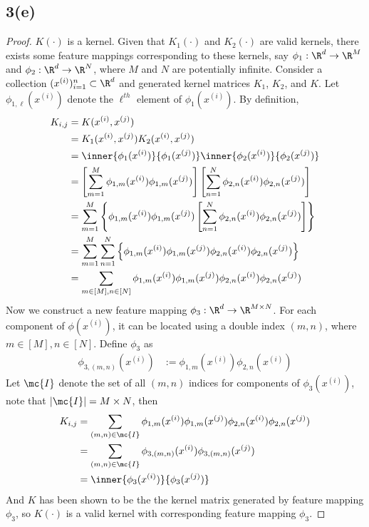 \documentclass[11pt]{article}
\newcommand{\upi}[0]{^{(i)}}
\newcommand{\upj}[0]{^{(j)}}
\begin{document}
	\subsection{3(e)}
	\begin{proof}
		$K(\cdot)$ is a kernel. Given that $K_1(\cdot)$ and $K_2(\cdot)$ are valid kernels, there exists some feature mappings corresponding to these kernels, say $\phi_1: \R^d \to \R^M$ and $\phi_2: \R^d \to \R^N$, where $M$ and $N$ are potentially infinite. Consider a collection $(x\upi)_{i=1}^n \subset \R^d$ and generated kernel matrices $K_1$, $K_2$, and $K$. Let $\phi_{1, \ell}(x\upi)$ denote the $\ell^{th}$ element of $\phi_1(x\upi)$. By definition,
		\begin{align}
			K_{i, j} &= K(x\upi, x\upj) \\
			&= K_1(x\upi, x^{(j)}) K_2(x\upi, x\upj) \\
			&= \inner{\phi_1(x\upi)}{\phi_1(x\upj)} \inner{\phi_2(x\upi)}{\phi_2(x\upj)} \\
			&= \left [
			\sum_{m=1}^M \phi_{1,m} (x\upi) \phi_{1,m}(x\upj)
			\right] \left[
			\sum_{n=1}^N \phi_{2,n} (x\upi) \phi_{2,n}(x\upj)
			\right] \\
			&= \sum_{m=1}^M 
			\left \{ \phi_{1,m} (x\upi) \phi_{1,m}(x\upj)
			\left[
			\sum_{n=1}^N \phi_{2,n} (x\upi) \phi_{2,n}(x\upj)
			\right] \right\} \\
			&= \sum_{m=1}^M \sum_{n=1}^N \left \{
			\phi_{1,m} (x\upi) \phi_{1,m}(x\upj)
			\phi_{2,n} (x\upi) \phi_{2,n}(x\upj)
			\right \} \\
			&= \sum_{m \in [M], n \in [N]}
			\phi_{1,m} (x\upi) \phi_{1,m}(x\upj)
			\phi_{2,n} (x\upi) \phi_{2,n}(x\upj)
		\end{align}
		Now we construct a new feature mapping $\phi_3: \R^d \to \R^{M \times N}$. For each component of $\phi(x\upi)$, it can be located using a double index $(m, n)$, where $m \in [M], n \in [N]$. Define $\phi_3$ as 
		\begin{align}
			\phi_{3, (m, n)}(x\upi) &:= \phi_{1, m} (x\upi) \phi_{2, n}(x\upi)
		\end{align}
		Let $\mc{I}$ denote the set of all $(m, n)$ indices for components of $\phi_3(x\upi)$, note that $|\mc{I}| = M \times N$, then 
		\begin{align}
			K_{i, j} &= \sum_{(m, n) \in \mc{I}}
			\phi_{1,m} (x\upi) \phi_{1,m}(x\upj)
			\phi_{2,n} (x\upi) \phi_{2,n}(x\upj) \\
			&= \sum_{(m, n) \in \mc{I}} \phi_{3, (m, n)}(x\upi) \phi_{3, (m, n)}(x\upj) \\
			&= \inner{\phi_3(x\upi)}{\phi_3(x\upj)}
		\end{align}
		And $K$ has been shown to be the the kernel matrix generated by feature mapping $\phi_3$, so $K(\cdot)$ is a valid kernel with corresponding feature mapping $\phi_3$.
	\end{proof}
	
\end{document}
